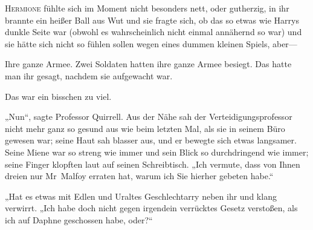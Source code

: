 
\lettrine{H}{ermione} fühlte sich im Moment nicht besonders nett, oder gutherzig, in ihr brannte ein heißer Ball aus Wut und sie fragte sich, ob das so etwas wie Harrys dunkle Seite war (obwohl es wahrscheinlich nicht einmal annähernd so war) und sie hätte sich nicht so fühlen sollen wegen eines dummen kleinen Spiels, aber—

Ihre ganze Armee. Zwei Soldaten hatten ihre ganze Armee besiegt. Das hatte man ihr gesagt, nachdem sie aufgewacht war.

Das war ein bisschen zu viel.

„Nun“, sagte Professor Quirrell. Aus der Nähe sah der Verteidigungsprofessor nicht mehr ganz so gesund aus wie beim letzten Mal, als sie in seinem Büro gewesen war; seine Haut sah blasser aus, und er bewegte sich etwas langsamer. Seine Miene war so streng wie immer und sein Blick so durchdringend wie immer; seine Finger klopften laut auf seinen Schreibtisch. „Ich vermute, dass von Ihnen dreien nur Mr~Malfoy erraten hat, warum ich Sie hierher gebeten habe.“

„Hat es etwas mit Edlen und Uraltes Geschlechtarry neben ihr und klang verwirrt. „Ich habe doch nicht gegen irgendein verrücktes Gesetz verstoßen, als ich auf Daphne geschossen habe, oder?“

